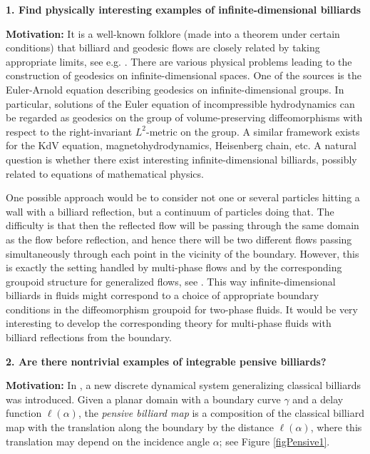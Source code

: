 \documentclass[11pt]{article}
\theoremstyle{definition}
\begin{document}
\textbf{1. Find physically interesting examples of infinite-dimensional billiards}

\smallskip

{\bf Motivation:} 
It is a well-known folklore (made into a theorem under certain conditions) that billiard and geodesic flows are closely related by taking appropriate limits, see e.g. \cite{Giannetto, Lange}. There are various physical problems leading to the construction of geodesics on infinite-dimensional spaces. One of the sources is the Euler-Arnold equation describing geodesics on infinite-dimensional groups. In particular, solutions of the Euler equation of incompressible hydrodynamics can be regarded as geodesics on the group of volume-preserving diffeomorphisms with respect to the right-invariant $L^2$-metric on the group. A similar framework exists for the KdV equation, magnetohydrodynamics, Heisenberg chain, etc. \cite{Arnold66, ArnKh}
A natural question is whether there exist interesting infinite-dimensional billiards, possibly related to equations of mathematical physics.

One possible approach would be to consider not one or several particles hitting a wall with a billiard reflection, but a continuum of particles doing that. The difficulty is that then the reflected flow will be passing through the same domain as the flow before reflection, and hence there will be two different flows passing simultaneously through each point in the vicinity of the boundary. However, this is exactly the setting handled by multi-phase flows and by the corresponding groupoid structure for generalized flows, see \cite{Brenier, IzKh}. This way infinite-dimensional billiards in fluids might correspond to a choice of appropriate boundary conditions in the diffeomorphism groupoid for two-phase fluids. It would be very interesting to develop the corresponding theory for multi-phase fluids with billiard reflections from the boundary.

\medskip

\textbf{2. Are there nontrivial examples of integrable pensive billiards?}

\smallskip

{\bf Motivation:} In \cite{DGK}, a new discrete dynamical system generalizing classical billiards was introduced. Given a planar domain with a boundary curve $\gamma$ and a delay function $\ell(\alpha)$, the {\it pensive billiard map} is a composition of the classical billiard map with the translation along the boundary by the distance $\ell(\alpha)$, where this translation may depend on the incidence angle $\alpha$; see Figure \ref{figPensive1}. 
\end{document}
